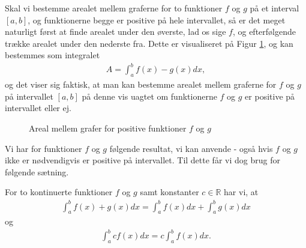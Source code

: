 \documentclass[12pt]{article}
\begin{document}
Skal vi bestemme arealet mellem graferne for to funktioner $f$ og $g$ på et interval $[a,b]$, og funktionerne begge er positive på hele intervallet, så er det meget naturligt først at finde arealet under den øverste, lad os sige $f$, og efterfølgende trække arealet under den nederste fra. Dette er visualiseret på Figur \ref{fig:arealmellemgrafer}, og kan bestemmes som integralet
\begin{align*}
	A = \int_a^b f(x) - g(x) dx,
\end{align*}
og det viser sig faktisk, at man kan bestemme arealet mellem graferne for $f$ og $g$ på intervallet $[a,b]$ på denne vis 
uagtet om funktionerne $f$ og $g$ er positive på intervallet eller ej. 
\begin{figure}[H]
	\centering
	\caption{Areal mellem grafer for positive funktioner $f$ og $g$}
	\label{fig:arealmellemgrafer}
\end{figure}
Vi har for funktioner $f$ og $g$ følgende resultat, vi kan anvende - også hvis $f$ og $g$ ikke er nødvendigvis er positive på intervallet.
Til dette får vi dog brug for følgende sætning.
\newpage
\begin{setn}
	\label{setn:hjælp}
	For to kontinuerte funktioner $f$ og $g$ samt konstanter $c \in \mathbb{R}$ har vi, at 
	\begin{align*}
		\int_a^bf(x) + g(x) dx = \int_a^b f(x) dx + \int_a^b g(x) dx
	\end{align*}
	og
	\begin{align*}
		\int_a^b cf(x) dx = c\int_a^b f(x) dx.
	\end{align*}
\end{setn}
\end{document}
